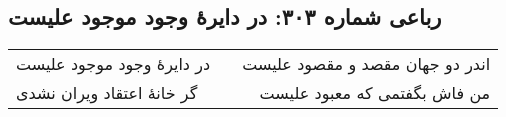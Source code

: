 \begin{center}
\section*{رباعی شماره ۳۰۳: در دایرهٔ وجود موجود علیست}
\label{sec:0303}
\begin{longtable}{l p{0.5cm} r}
در دایرهٔ وجود موجود علیست
&&
اندر دو جهان مقصد و مقصود علیست
\\
گر خانهٔ اعتقاد ویران نشدی
&&
من فاش بگفتمی که معبود علیست
\\
\end{longtable}
\end{center}
